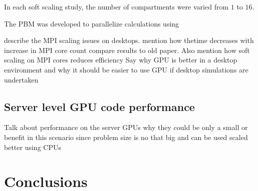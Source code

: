 \documentclass[preprint,10pt,authoryear]{elsarticle}
\begin{document}
\begin{linenumbers}
In each soft scaling study,
the number of compartments were varied from $1$ to $16$. 





The PBM was developed to parallelize calculations using 


describe the MPI scaling issues on desktops.
mention how thetime decreases with increase in MPI core count
compare results to old paper. Also mention how soft scaling on MPI cores reduces
efficiency
Say why GPU is better in a desktop environment and why it should be 
easier to use GPU if desktop simulations are undertaken


\subsection{Server level GPU code performance}
Talk about performance on the server GPUs why they could be only a small or benefit in 
this scenario since problem size is no that big and can be used scaled better using CPUs




\section{Conclusions}
\label{secConc}
\end{linenumbers}



\end{document}
